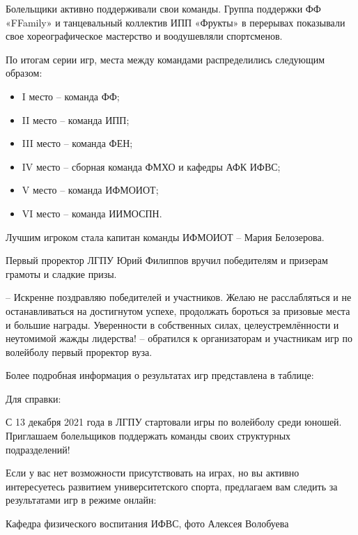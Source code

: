 Болельщики активно поддерживали свои команды. Группа поддержки ФФ «FFamily» и
танцевальный коллектив ИПП «Фрукты» в перерывах показывали свое
хореографическое мастерство и воодушевляли спортсменов.

По итогам серии игр, места между командами распределились следующим образом:

\begin{itemize}
  \item I место – команда ФФ;
  \item II место – команда ИПП;
  \item III место – команда ФЕН;
  \item IV место – сборная команда ФМХО и кафедры АФК ИФВС;
  \item V место – команда ИФМОИОТ;
  \item VI место – команда ИИМОСПН.
\end{itemize}

Лучшим игроком стала капитан команды ИФМОИОТ – Мария Белозерова.

Первый проректор ЛГПУ Юрий Филиппов вручил победителям и призерам грамоты и
сладкие призы.

\begin{zznagolos}
– Искренне поздравляю победителей и участников. Желаю не расслабляться и не
останавливаться на достигнутом успехе, продолжать бороться за призовые места и
большие награды. Уверенности в собственных силах, целеустремлённости и
неутомимой жажды лидерства! – обратился к организаторам и участникам игр по
волейболу первый проректор вуза.	
\end{zznagolos}

Более подробная информация о результатах игр представлена в таблице:


Для справки:

С 13 декабря 2021 года в ЛГПУ стартовали игры по волейболу среди юношей.
Приглашаем болельщиков поддержать команды своих структурных подразделений!


Если у вас нет возможности присутствовать на играх, но вы активно интересуетесь
развитием университетского спорта, предлагаем вам следить за результатами игр в
режиме онлайн:


Кафедра физического воспитания ИФВС, фото Алексея Волобуева

